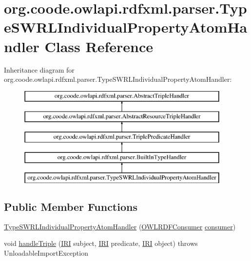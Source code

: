 \hypertarget{classorg_1_1coode_1_1owlapi_1_1rdfxml_1_1parser_1_1_type_s_w_r_l_individual_property_atom_handler}{\section{org.\-coode.\-owlapi.\-rdfxml.\-parser.\-Type\-S\-W\-R\-L\-Individual\-Property\-Atom\-Handler Class Reference}
\label{classorg_1_1coode_1_1owlapi_1_1rdfxml_1_1parser_1_1_type_s_w_r_l_individual_property_atom_handler}
}
Inheritance diagram for org.\-coode.\-owlapi.\-rdfxml.\-parser.\-Type\-S\-W\-R\-L\-Individual\-Property\-Atom\-Handler\-:\begin{figure}[H]
\begin{center}
\leavevmode
\includegraphics[height=5.000000cm]{classorg_1_1coode_1_1owlapi_1_1rdfxml_1_1parser_1_1_type_s_w_r_l_individual_property_atom_handler}
\end{center}
\end{figure}
\subsection*{Public Member Functions}
\begin{DoxyCompactItemize}
\item 
\hyperlink{classorg_1_1coode_1_1owlapi_1_1rdfxml_1_1parser_1_1_type_s_w_r_l_individual_property_atom_handler_a6e689f3ae3d3251abb6bf949e243a2bd}{Type\-S\-W\-R\-L\-Individual\-Property\-Atom\-Handler} (\hyperlink{classorg_1_1coode_1_1owlapi_1_1rdfxml_1_1parser_1_1_o_w_l_r_d_f_consumer}{O\-W\-L\-R\-D\-F\-Consumer} \hyperlink{classorg_1_1coode_1_1owlapi_1_1rdfxml_1_1parser_1_1_abstract_triple_handler_a4ccf4d898ff01eb1cadfa04b23d54e9c}{consumer})
\item 
void \hyperlink{classorg_1_1coode_1_1owlapi_1_1rdfxml_1_1parser_1_1_type_s_w_r_l_individual_property_atom_handler_afb3d8ff9f6b751382146c832b30d7c79}{handle\-Triple} (\hyperlink{classorg_1_1semanticweb_1_1owlapi_1_1model_1_1_i_r_i}{I\-R\-I} subject, \hyperlink{classorg_1_1semanticweb_1_1owlapi_1_1model_1_1_i_r_i}{I\-R\-I} predicate, \hyperlink{classorg_1_1semanticweb_1_1owlapi_1_1model_1_1_i_r_i}{I\-R\-I} object)  throws Unloadable\-Import\-Exception 
\end{DoxyCompactItemize}
